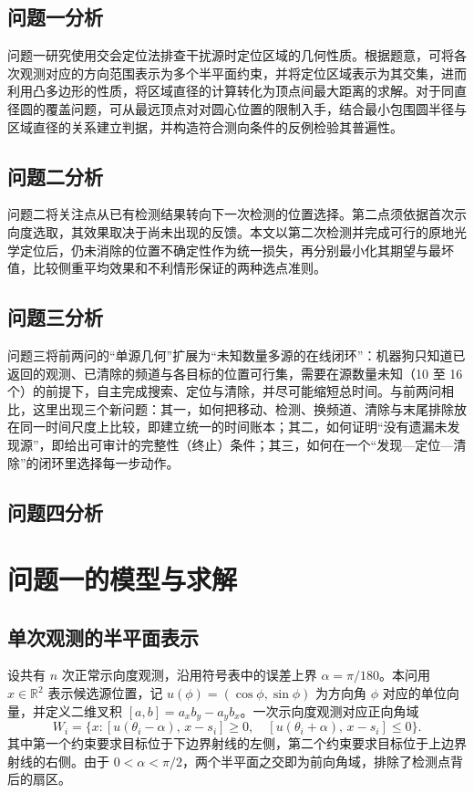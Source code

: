\documentclass[UTF8,a4paper,zihao=-4,fontset=none]{ctexart}
\begin{document}
\subsection{问题一分析}

问题一研究使用交会定位法排查干扰源时定位区域的几何性质。根据题意，可将各次观测对应的方向范围表示为多个半平面约束，并将定位区域表示为其交集，进而利用凸多边形的性质，将区域直径的计算转化为顶点间最大距离的求解。对于同直径圆的覆盖问题，可从最远顶点对对圆心位置的限制入手，结合最小包围圆半径与区域直径的关系建立判据，并构造符合测向条件的反例检验其普遍性。

\subsection{问题二分析}

问题二将关注点从已有检测结果转向下一次检测的位置选择。第二点须依据首次示向度选取，其效果取决于尚未出现的反馈。本文以第二次检测并完成可行的原地光学定位后，仍未消除的位置不确定性作为统一损失，再分别最小化其期望与最坏值，比较侧重平均效果和不利情形保证的两种选点准则。
\subsection{问题三分析}

问题三将前两问的“单源几何”扩展为“未知数量多源的在线闭环”：机器狗只知道已返回的观测、已清除的频道与各目标的位置可行集，需要在源数量未知（10 至 16 个）的前提下，自主完成搜索、定位与清除，并尽可能缩短总时间。与前两问相比，这里出现三个新问题：其一，如何把移动、检测、换频道、清除与末尾排除放在同一时间尺度上比较，即建立统一的时间账本；其二，如何证明“没有遗漏未发现源”，即给出可审计的完整性（终止）条件；其三，如何在一个“发现—定位—清除”的闭环里选择每一步动作。

\subsection{问题四分析}


\section{问题一的模型与求解}

\subsection{单次观测的半平面表示}

设共有 \(n\) 次正常示向度观测，沿用符号表中的误差上界 \(\alpha=\pi/180\)。本问用 \(x\in\mathbb R^2\) 表示候选源位置，记 \(u(\phi)=(\cos\phi,\sin\phi)\) 为方向角 \(\phi\) 对应的单位向量，并定义二维叉积 \([a,b]=a_xb_y-a_yb_x\)。一次示向度观测对应正向角域
\begin{equation}
  W_i=\{x:[u(\theta_i-\alpha),\,x-s_i]\ge0,\quad [u(\theta_i+\alpha),\,x-s_i]\le0\}.
  \label{eq:wedge}
\end{equation}
其中第一个约束要求目标位于下边界射线的左侧，第二个约束要求目标位于上边界射线的右侧。由于 \(0<\alpha<\pi/2\)，两个半平面之交即为前向角域，排除了检测点背后的扇区。
\end{document}
